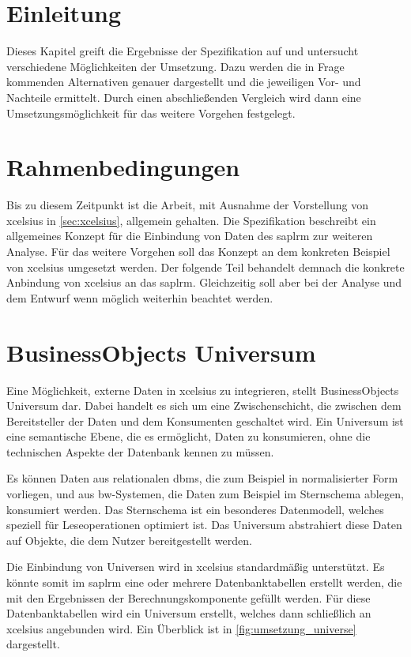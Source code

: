 \begin{onehalfspacing}
\section{Einleitung}
Dieses Kapitel greift die Ergebnisse der Spezifikation auf und untersucht verschiedene Möglichkeiten der Umsetzung. Dazu werden die in Frage kommenden Alternativen genauer dargestellt und die jeweiligen Vor- und Nachteile ermittelt. Durch einen abschließenden Vergleich wird dann eine Umsetzungsmöglichkeit für das weitere Vorgehen festgelegt.

\section{Rahmenbedingungen}
Bis zu diesem Zeitpunkt ist die Arbeit, mit Ausnahme der Vorstellung von \gls{xcelsius} in \vref{sec:xcelsius}, allgemein gehalten. Die Spezifikation beschreibt ein allgemeines Konzept für die Einbindung von Daten des \gls{saplrm} zur weiteren Analyse. Für das weitere Vorgehen soll das Konzept an dem konkreten Beispiel von \gls{xcelsius} umgesetzt werden. Der folgende Teil behandelt demnach die konkrete Anbindung von \gls{xcelsius} an das \gls{saplrm}. Gleichzeitig soll aber bei der Analyse und dem Entwurf  wenn möglich weiterhin beachtet werden.

\section{BusinessObjects Universum}
Eine Möglichkeit, externe Daten in \gls{xcelsius} zu integrieren, stellt BusinessObjects Universum dar. Dabei handelt es sich um eine Zwischenschicht, die zwischen dem Bereitsteller der Daten und dem Konsumenten geschaltet wird. Ein Universum ist eine semantische Ebene, die es ermöglicht, Daten zu konsumieren, ohne die technischen Aspekte der Datenbank kennen zu müssen.


Es können Daten aus relationalen \gls{dbms}, die zum Beispiel in normalisierter Form vorliegen, und aus \gls{bw}-Systemen, die Daten zum Beispiel im Sternschema ablegen, konsumiert werden. Das Sternschema ist ein besonderes Datenmodell, welches speziell für Leseoperationen optimiert ist. Das Universum abstrahiert diese Daten auf Objekte, die dem Nutzer bereitgestellt werden.

Die Einbindung von Universen wird in \gls{xcelsius} standardmäßig unterstützt. Es könnte somit im \gls{saplrm} eine oder mehrere Datenbanktabellen erstellt werden, die mit den Ergebnissen der Berechnungskomponente gefüllt werden. Für diese Datenbanktabellen wird ein Universum erstellt, welches dann schließlich an \gls{xcelsius} angebunden wird. Ein Überblick ist in \vref{fig:umsetzung_universe} dargestellt.


\end{onehalfspacing}
